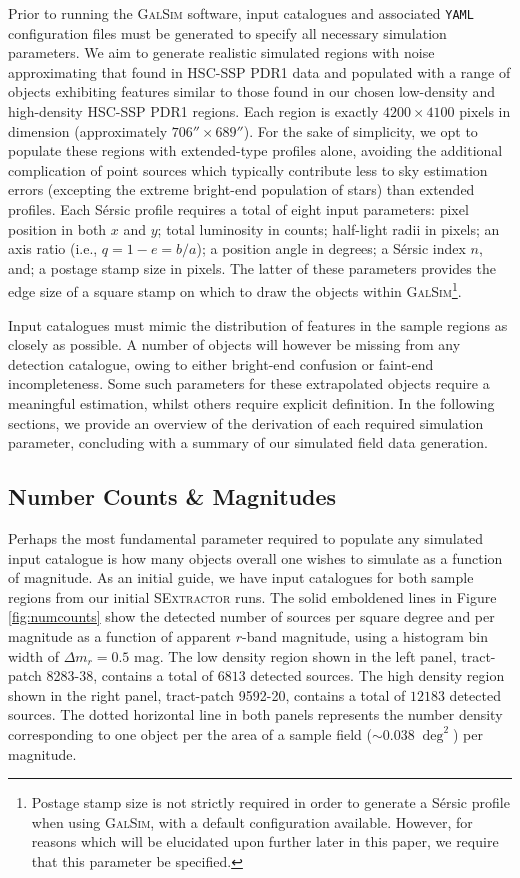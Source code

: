 \documentclass[fleqn,usenatbib,useAMS]{mnras}
\newcommand*{\about}{\mathord\sim}
\newcommand*{\Sersic}{S\'{e}rsic\xspace}
\newcommand*{\SExtractor}{\textsc{SExtractor}\xspace}
\newcommand*{\GalSim}{\textsc{GalSim}\xspace}
\begin{document}
Prior to running the \GalSim software, input catalogues and associated \texttt{YAML} configuration files must be generated to specify all necessary simulation parameters. We aim to generate realistic simulated regions with noise approximating that found in HSC-SSP PDR1 data and populated with a range of objects exhibiting features similar to those found in our chosen low-density and high-density HSC-SSP PDR1 regions. Each region is exactly $4200\times4100$ pixels in dimension (approximately $706''\times689''$). For the sake of simplicity, we opt to populate these regions with extended-type \citet{Sersic1963,Sersic1968} profiles alone, avoiding the additional complication of point sources which typically contribute less to sky estimation errors (excepting the extreme bright-end population of stars) than extended profiles. Each \Sersic profile requires a total of eight input parameters: pixel position in both $x$ and $y$; total luminosity in counts; half-light radii in pixels; an axis ratio (i.e., $q = 1-e = b/a$); a position angle in degrees; a \Sersic index $n$, and; a postage stamp size in pixels. The latter of these parameters provides the edge size of a square stamp on which to draw the objects within \GalSim\footnote{Postage stamp size is not strictly required in order to generate a \Sersic profile when using \GalSim, with a default configuration available. However, for reasons which will be elucidated upon further later in this paper, we require that this parameter be specified.}. 

Input catalogues must mimic the distribution of features in the sample regions as closely as possible. A number of objects will however be missing from any detection catalogue, owing to either bright-end confusion or faint-end incompleteness. Some such parameters for these extrapolated objects require a meaningful estimation, whilst others require explicit definition. In the following sections, we provide an overview of the derivation of each required simulation parameter, concluding with a summary of our simulated field data generation. 

\subsection{Number Counts \& Magnitudes}
\label{sec:numcounts}

Perhaps the most fundamental parameter required to populate any simulated input catalogue is how many objects overall one wishes to simulate as a function of magnitude. As an initial guide, we have input catalogues for both sample regions from our initial \SExtractor runs. The solid emboldened lines in Figure \ref{fig:numcounts} show the detected number of sources per square degree and per magnitude as a function of apparent $r$-band magnitude, using a histogram bin width of $\Delta m_r=0.5$ mag. The low density region shown in the left panel, tract-patch 8283-38, contains a total of $6813$ detected sources. The high density region shown in the right panel, tract-patch 9592-20, contains a total of $12183$ detected sources. The dotted horizontal line in both panels represents the number density corresponding to one object per the area of a sample field ($\about0.038\;\deg^2$) per magnitude. 
\end{document}
